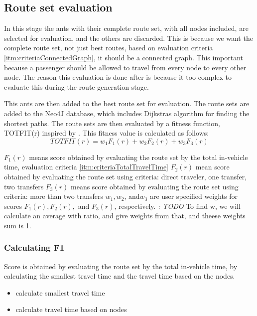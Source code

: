 \subsection{Route set evaluation}
In this stage the ants with their complete route set, with all nodes included, are selected for evaluation, and the others are discarded. This is because we want the complete route set, not just best routes, based on evaluation criteria \ref{itm:criteriaConnectedGraph}, it should be a connected graph. This important because a passenger should be allowed to travel from every node to every other node. The reason this evaluation is done after is because it too complex to evaluate this during the route generation stage. 

This ants are then added to the best route set for evaluation. 
The route sets are added to the Neo4J database, which includes Dijkstras algorithm for finding the shortest paths. 
The route sets are then evaluated by a fitness function, TOTFIT(r) inspired by \citep{kechagiopoulos14}.
This fitness value is calculated as follows:
$$ TOTFIT(r) = w_{1}F_{1}(r) + w_{2}F_{2}(r) + w_{3}F_{3}(r)$$

$ F_{1}(r)$ means score obtained by evaluating the route set by the total in-vehicle time, evaluation criteria \ref{itm:criteriaTotalTravelTime}
\newline
$ F_{2}(r)$ mean score obtained by evaluating the route set using criteria: direct traveler, one transfer, two transfers
\newline
$ F_{3}(r)$ means score obtained by evaluating the route set using criteria: more than two transfers 
\newline
$ w_{1}, w_{2}$, and$ w_{3}$ are user specified weights for scores $ F_{1}(r), F_{2}(r),$ and $ F_{3}(r)$, respectively. \textit{: TODO}
To find w, we will calculate an average with ratio, and give weights from that, and theese weights sum is 1.  

\subsubsection{Calculating F1}
Score is obtained by evaluating the route set by the total in-vehicle time, by calculating the smallest travel time and the travel time based on the nodes.
\begin{itemize}
\item calculate smallest travel time
\item calculate travel time based on nodes
\end{itemize}

